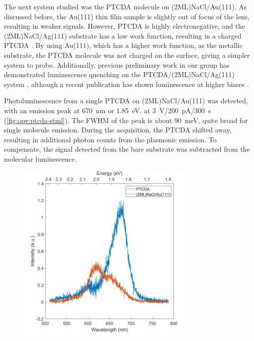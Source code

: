 The next system studied was the \ac{PTCDA} molecule on (2ML)NaCl/Au(111). As discussed before, the Au(111) thin film sample is slightly out of focus of the lens, resulting in weaker signals. However, \ac{PTCDA} is highly electronegative, and the (2ML)NaCl/Ag(111) substrate has a low work function, resulting in a charged PTCDA \citep{cochrane2017single,cochrane2018molecularly}. By using Au(111), which has a higher work function, as the metallic substrate, the PTCDA molecule was not charged on the surface, giving a simpler system to probe. Additionally, previous preliminary work in our group has demonstrated luminescence quenching on the PTCDA/(2ML)NaCl/Ag(111) system \citep{roussy2016coupling}, although a recent publication has shown luminescence at higher biases \citep{Kimura2019}.

Photoluminescence from a single PTCDA on (2ML)NaCl/Au(111) was detected, with an emission peak at \SI{670}{nm} or \SI{1.85}{eV}, at \SI{3}{V}/\SI{200}{pA}/\SI{300}{s} (\autoref{fig:opv:ptcda-stml}). The \ac{FWHM} of the peak is about \SI{90}{meV}, quite broad for single molecule emission. During the acquisition, the PTCDA shifted away, resulting in additional photon counts from the plasmonic emission. To compensate, the signal detected from the bare substrate was subtracted from the molecular luminescence.


\begin{figure} [h]
    \centering
        \includegraphics[width=3.5in]{pictures/ptcda_subtract_pl_3V_200pA_300s.jpg}
    \caption{}
    \label{fig:opv:ptcda-stml}
\end{figure}

